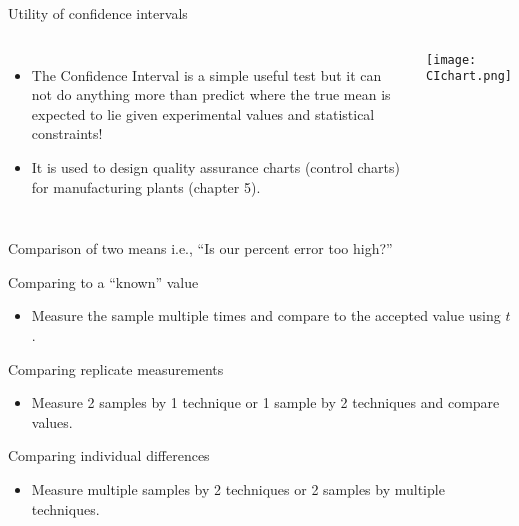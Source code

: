 \documentclass[notes=hide]{beamer}
\begin{document}
\begin{frame}{Utility of confidence intervals}
	\begin{columns}
	\begin{itemize}
		\item The Confidence Interval is a simple useful test but it can
			not do anything more than \alert{predict} where the true
			mean is expected to lie given experimental values and
			statistical constraints!
		\item It is used to design quality assurance charts (control
			charts) for manufacturing plants (chapter 5).
	\end{itemize}
		\texttt{[image: CIchart.png]}
	\end{columns}
\end{frame}

\begin{frame}{Comparison of two means}
	{i.e., ``Is our percent error \alert{too} high?''}

	\begin{description}[<+->]
		\item[Case 1:] Comparing to a ``known'' value
		        \begin{itemize}[<1->]
		        	\item Measure the sample multiple times and
		        		compare to the accepted value using $t$.
		        \end{itemize}
		\item[Case 2:] Comparing replicate measurements
		        \begin{itemize}[<1->]
		        	\item Measure 2 samples by 1 technique or 1
		        		sample by 2 techniques and compare
		        		values.
		        \end{itemize}
		\item[Case 3:] Comparing individual differences
			\begin{itemize}[<1->]
				\item Measure multiple samples by 2 techniques
					or 2 samples by multiple techniques.
			\end{itemize}
	\end{description}
\end{frame}
\end{document}
